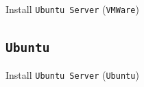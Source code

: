 \documentclass{beamer}
\begin{document}
\begin{frame}{Install \texttt{Ubuntu Server} (\texttt{VMWare})}
\begin{center}
\begin{figure}
\begin{overprint}
      \end{overprint}      
    \end{figure}
  \end{center}
\end{frame}

\subsection{\texttt{Ubuntu}}
\begin{frame}{Install \texttt{Ubuntu Server} (\texttt{Ubuntu})}
  \begin{figure}
    \begin{overprint}
      \setlength{\fboxsep}{0pt}%
      \setlength{\fboxrule}{0.5pt}%
      \centering{}
      \centering{}
      \centering{}

\end{overprint}
\end{figure}
\end{frame}
\end{document}
